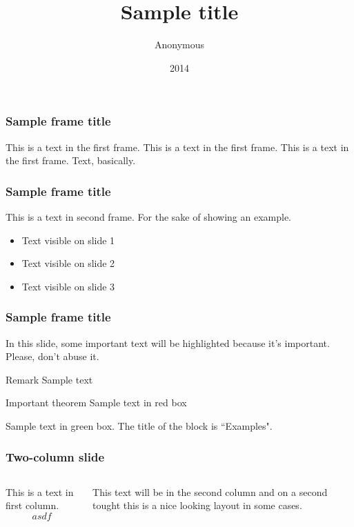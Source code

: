\documentclass{beamer}
\title{Sample title}
\author{Anonymous}
\institute{Overleaf}
\date{2014}
\begin{document}
 
\frame{\titlepage}
 
\begin{frame}
\frametitle{Sample frame title}
This is a text in the first frame. This is a text in the first frame. This is a text in the first frame. Text, basically.
\end{frame}
 
 
 
 
 
 \begin{frame}
 \frametitle{Sample frame title}
 This is a text in second frame. 
 For the sake of showing an example.
 
 \begin{itemize}
 	\item<1-> Text visible on slide 1
 	\item<2-> Text visible on slide 2
 	\item<3-> Text visible on slide 3
 \end{itemize}
 
\end{frame}





\begin{frame}
\frametitle{Sample frame title}

In this slide, some important text will be
\alert{highlighted} because it's important.
Please, don't abuse it.

\begin{block}{Remark}
	Sample text
\end{block}

\begin{alertblock}{Important theorem}
	Sample text in red box
\end{alertblock}

\begin{examples}
	Sample text in green box. The title of the block is ``Examples".
\end{examples}
\end{frame}

\begin{frame}
\frametitle{Two-column slide}
\begin{columns}
	
	This is a text in first column.
	$$asdf$$
	
	This text will be in the second column
	and on a second tought this is a nice looking
	layout in some cases.
\end{columns}
\end{frame}








 
\end{document}
